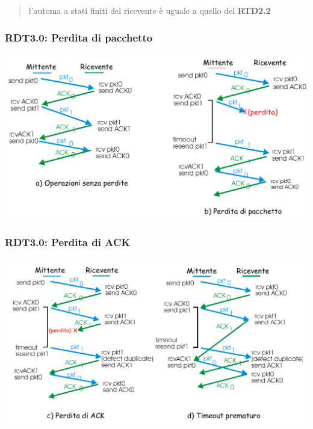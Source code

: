 \begin{quote}
l'automa a stati finiti del ricevente è uguale a quello del \textbf{RTD2.2}
\end{quote}

\subsubsection*{RDT3.0: Perdita di pacchetto}
\begin{center}
\includegraphics[width=\textwidth]{./img/rdt3.01.png}
\end{center}

\subsubsection*{RDT3.0: Perdita di ACK}
\begin{center}
\includegraphics[width=\textwidth]{./img/rdt3.02.png}
\end{center}

